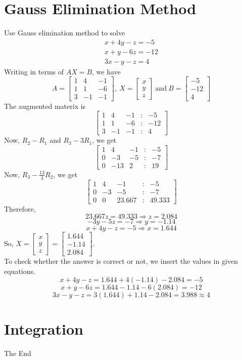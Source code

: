 \documentclass[]{book}
\begin{document}
\chapter{Gauss Elimination Method}
Use Gauss elimination method to solve
\begin{eqnarray}
\nonumber x+4y-z=-5\\
\nonumber x+y-6z=-12\\
\nonumber 3x-y-z=4
\end{eqnarray} 
Writing in terms of $AX = B$, we have
$$A = \begin{bmatrix}
1 & 4 & -1\\
1 & 1 & -6\\
3 & -1 & -1
\end{bmatrix},\ X = \begin{bmatrix}
x\\ y\\ z
\end{bmatrix}\ \text{and}\ B = \begin{bmatrix}
-5\\ -12\\ 4
\end{bmatrix}$$
The augmented materix is
$$\begin{bmatrix}
1 & 4 & -1 & : & -5\\
1 & 1 & -6 & : & -12\\
3 & -1 & -1 & : & 4
\end{bmatrix}$$
Now, $R_{2}-R_{1}$ and $R_{3}-3R_{1}$, we get
$$\begin{bmatrix}
1 & 4 & -1 & : & -5\\
0 & -3 & -5 & : & -7\\
0 & -13 & 2 & : & 19
\end{bmatrix}$$
Now, $R_{3} - \frac{13}{3}R_{2}$, we get
$$\begin{bmatrix}
1 & 4 & -1 & : & -5\\
0 & -3 & -5 & : & -7\\
0 & 0 & 23.667 & : & 49.333
\end{bmatrix}$$
Therefore,
$$23.667z = 49.333 \Rightarrow z = 2.084$$
$$-3y-5z=-7 \Rightarrow y = -1.14$$
$$x+4y-z=-5 \Rightarrow x = 1.644$$
So, $X = \begin{bmatrix}
x\\ y\\ z \end{bmatrix} = \begin{bmatrix}
1.644\\ -1.14\\ 2.084
\end{bmatrix}$.\\
To check whether the answer is correct or not, we insert the values in given equations.
$$x+4y-z= 1.644+4(-1.14)-2.084 = -5$$
$$x+y-6z= 1.644-1.14-6(2.084) = -12$$
$$3x-y-z= 3(1.644)+1.14-2.084 = 3.988 \approx 4$$


\chapter{Integration}







The End
\end{document}
